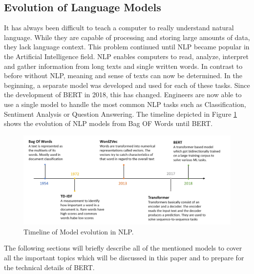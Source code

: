 \subsection{Evolution of Language Models}
It has always been difficult to teach a computer to really understand natural language. While they are capable of processing and storing large amounts of data, they lack language context. This problem continued until NLP became popular in the Artificial Intelligence field. NLP enables computers to read, analyze, interpret and gather information from long texts and single written words. In contrast to before without NLP, meaning and sense of texts can now be determined. In the beginning, a separate model was developed and used for each of these tasks. Since the development of BERT in 2018, this has changed. Engineers are now able to use a single model to handle the most common NLP tasks such as Classification, Sentiment Analysis or Question Answering. The timeline depicted in Figure \ref{fig:timeline} shows the evolution of NLP models from \alert{Bag OF Words} until \alert{BERT}.

\begin{figure}[H]
	\centering
	\includegraphics[width=1\textwidth]{figures/timeline_NLP.PNG}
	\caption{Timeline of Model evolution in NLP.}
	\label{fig:timeline}
\end{figure}

The following sections will briefly describe all of the mentioned models to cover all the important topics which will be discussed in this paper and to prepare for the technical details of BERT.

